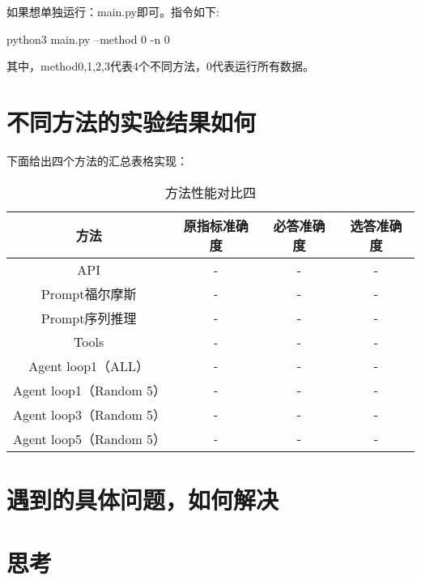 \documentclass[answers]{exam}  %
\begin{document}
如果想单独运行：main.py即可。指令如下:

python3 main.py --method 0 -n 0

其中，method0,1,2,3代表4个不同方法，0代表运行所有数据。

\section{不同方法的实验结果如何}

下面给出四个方法的汇总表格实现：
\begin{table}[h]
    \centering
    \begin{tabular}{cccc}
    \toprule
    \textbf{方法} & \textbf{原指标准确度} & \textbf{必答准确度} &\textbf{选答准确度}\\
    \midrule
    API & - & - & - \\
    \hline
    Prompt福尔摩斯 & - & - & - \\
    \hline
    Prompt序列推理 & - & - & - \\
    \hline
    Tools & - & - & - \\
    \hline
    Agent loop1（ALL） & - & - & - \\
    \hline
    Agent loop1（Random 5） & - & - & - \\
    \hline
    Agent loop3（Random 5） & - & - & - \\
    \hline
    Agent loop5（Random 5） & - & - & - \\
    \bottomrule
    \end{tabular}
    \caption{方法性能对比四}
\end{table}


\section{遇到的具体问题，如何解决}

\section{思考}
\end{document}
